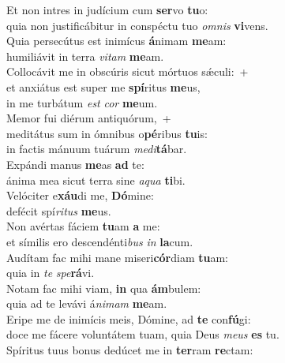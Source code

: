 \evenverse Et non intres in judícium cum \textbf{ser}vo \textbf{tu}o:~\*\\
\evenverse quia non justificábitur in conspéctu tuo \textit{om}\textit{nis} \textbf{vi}vens.\\
\oddverse Quia persecútus est inimícus \textbf{á}nimam \textbf{me}am:~\*\\
\oddverse humiliávit in terra \textit{vi}\textit{tam} \textbf{me}am.\\
\evenverse Collocávit me in obscúris sicut mórtuos sǽculi:~+\\
\evenverse  et anxiátus est super me \textbf{spí}ritus \textbf{me}us,~\*\\
\evenverse in me turbátum \textit{est} \textit{cor} \textbf{me}um.\\
\oddverse Memor fui diérum antiquórum,~+\\
\oddverse  meditátus sum in ómnibus o\textbf{pé}ribus \textbf{tu}is:~\*\\
\oddverse in factis mánuum tuárum \textit{me}\textit{di}\textbf{tá}bar.\\
\evenverse Expándi manus \textbf{me}as \textbf{ad} te:~\*\\
\evenverse ánima mea sicut terra sine \textit{a}\textit{qua} \textbf{ti}bi.\\
\oddverse Velóciter e\textbf{xáu}di me, \textbf{Dó}mine:~\*\\
\oddverse defécit spí\textit{ri}\textit{tus} \textbf{me}us.\\
\evenverse Non avértas fáciem \textbf{tu}am \textbf{a} me:~\*\\
\evenverse et símilis ero descendénti\textit{bus} \textit{in} \textbf{la}cum.\\
\oddverse Audítam fac mihi mane miseri\textbf{cór}diam \textbf{tu}am:~\*\\
\oddverse quia in \textit{te} \textit{spe}\textbf{rá}vi.\\
\evenverse Notam fac mihi viam, \textbf{in} qua \textbf{ám}bulem:~\*\\
\evenverse quia ad te levávi á\textit{ni}\textit{mam} \textbf{me}am.\\
\oddverse Eripe me de inimícis meis, Dómine, ad \textbf{te} con\textbf{fú}gi:~\*\\
\oddverse doce me fácere voluntátem tuam, quia Deus \textit{me}\textit{us} \textbf{es} tu.\\
\evenverse Spíritus tuus bonus dedúcet me in \textbf{ter}ram \textbf{re}ctam:~\*\\
